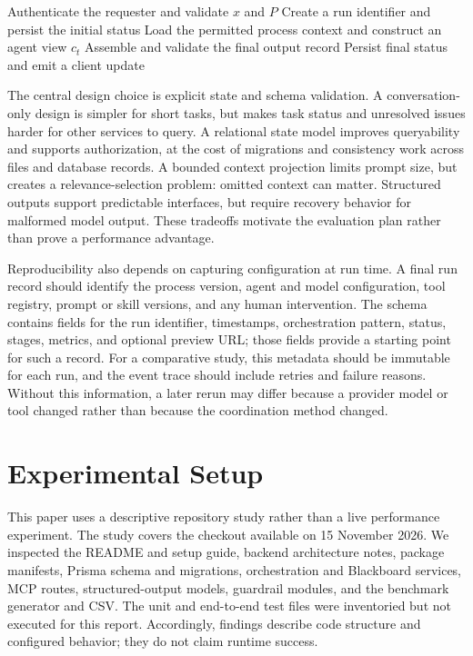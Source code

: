 \documentclass[12pt,onecolumn,draftclsnofoot]{IEEEtran}
\begin{document}
\begin{algorithm}[t]
\caption{Auditable multi-agent workflow run}
\label{alg:orchestration}
Authenticate the requester and validate $x$ and $P$\;
Create a run identifier and persist the initial status\;
Load the permitted process context and construct an agent view $c_t$\;
Assemble and validate the final output record\;
Persist final status and emit a client update\;
\end{algorithm}

The central design choice is explicit state and schema validation. A conversation-only design is simpler for short tasks, but makes task status and unresolved issues harder for other services to query. A relational state model improves queryability and supports authorization, at the cost of migrations and consistency work across files and database records. A bounded context projection limits prompt size, but creates a relevance-selection problem: omitted context can matter. Structured outputs support predictable interfaces, but require recovery behavior for malformed model output. These tradeoffs motivate the evaluation plan rather than prove a performance advantage.

Reproducibility also depends on capturing configuration at run time. A final run record should identify the process version, agent and model configuration, tool registry, prompt or skill versions, and any human intervention. The schema contains fields for the run identifier, timestamps, orchestration pattern, status, stages, metrics, and optional preview URL; those fields provide a starting point for such a record. For a comparative study, this metadata should be immutable for each run, and the event trace should include retries and failure reasons. Without this information, a later rerun may differ because a provider model or tool changed rather than because the coordination method changed.
\section{Experimental Setup}
This paper uses a descriptive repository study rather than a live performance experiment. The study covers the checkout available on 15 November 2026. We inspected the README and setup guide, backend architecture notes, package manifests, Prisma schema and migrations, orchestration and Blackboard services, MCP routes, structured-output models, guardrail modules, and the benchmark generator and CSV. The unit and end-to-end test files were inventoried but not executed for this report. Accordingly, findings describe code structure and configured behavior; they do not claim runtime success.
\end{document}
